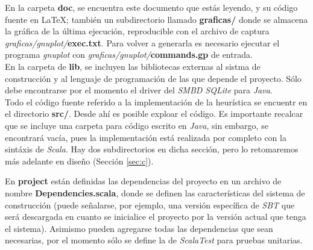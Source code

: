 \documentclass[12pt]{article}
\begin{document}
En la carpeta \textbf{doc}, se encuentra este documento que estás
leyendo, y su código fuente en \LaTeX; también un subdirectorio llamado
\textbf{graficas/} donde se almacena la gráfica de la última ejecución, reproducible con el archivo de captura \textit{graficas/gnuplot/}\textbf{exec.txt}. Para volver a generarla es necesario ejecutar el programa \textit{gnuplot} con \textit{graficas/gnuplot/}\textbf{commands.gp} de entrada.\\

En la carpeta de \textbf{lib}, se incluyen las bibliotecas externas al sistma de
construcción y al lenguaje de programación de las que depende el
proyecto. Sólo debe encontrarse por el
momento el driver del \textit{SMBD SQLite} para \textit{Java}. \\

Todo el código fuente referido a la implementación de la heurística
se encuentr en el directorio \textbf{src/}. Desde ahí es posible exploar
el código. Es importante recalcar que se incluye una carpeta para código
escrito en \textit{Java}, sin embargo, se encontrará vacía, pues la
implementación está realizada por completo con la sintáxis de \textit{Scala}. Hay dos subdirectorios en dicha sección, pero lo retomaremos más
adelante en diseño (Sección \ref{sec:c}).

En \textbf{project} están definidas las dependencias del proyecto en un
archivo de nombre \textbf{Dependencies.scala}, donde se definen las características del sistema de construcción (puede señalarse, por ejemplo, una versión específica de \textit{SBT} que será descargada en cuanto se inicialice el proyecto por la versión actual que tenga el sistema). Asimismo pueden agregarse todas las dependencias que sean necesarias, por el momento sólo se define la de \textit{ScalaTest} para pruebas unitarias.\\
\end{document}
